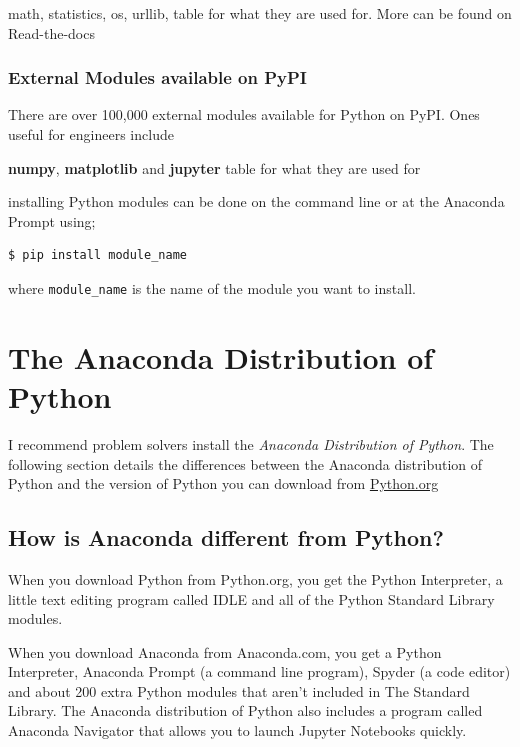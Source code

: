 \documentclass{book}
\begin{document}
math, statistics, os, urllib, table for what they are used for. More can
be found on Read-the-docs

\subsubsection{External Modules available on
PyPI}\label{external-modules-available-on-pypi}

There are over 100,000 external modules available for Python on PyPI.
Ones useful for engineers include

\textbf{numpy}, \textbf{matplotlib} and \textbf{jupyter} table for what
they are used for

installing Python modules can be done on the command line or at the
Anaconda Prompt using;

\begin{lstlisting}
$ pip install module_name
\end{lstlisting}

where \lstinline!module_name! is the name of the module you want to
install.

    \section{The Anaconda Distribution of
Python}\label{the-anaconda-distribution-of-python}

    I recommend problem solvers install the \emph{Anaconda Distribution of
Python}. The following section details the differences between the
Anaconda distribution of Python and the version of Python you can
download from \href{https://python.org}{Python.org}

    \subsection{How is Anaconda different from
Python?}\label{how-is-anaconda-different-from-python}

When you download Python from Python.org, you get the Python
Interpreter, a little text editing program called IDLE and all of the
Python Standard Library modules.

When you download Anaconda from Anaconda.com, you get a Python
Interpreter, Anaconda Prompt (a command line program), Spyder (a code
editor) and about 200 extra Python modules that aren't included in The
Standard Library. The Anaconda distribution of Python also includes a
program called Anaconda Navigator that allows you to launch Jupyter
Notebooks quickly.
\end{document}
